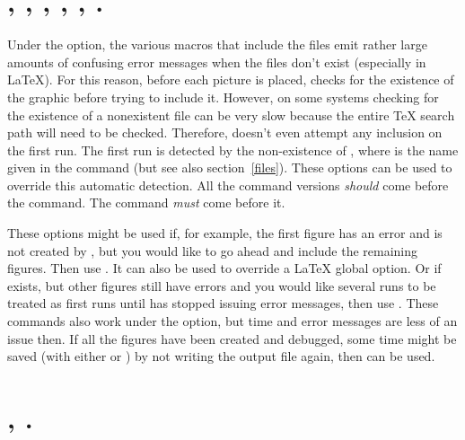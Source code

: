 \documentclass[letterpaper]{article}
\begin{document}
\section{, , , ,
    , .}\label{draft}
%
%
%
%
%

Under the  option, the various macros that include the
\EPS{} files emit rather large amounts of confusing error messages when
the files don't exist (especially in \LaTeX{}). For this reason, before
each picture is placed, \mfp{} checks for the existence of the graphic
before trying to include it. However, on some systems checking for the
existence of a nonexistent file can be very slow because the entire
\TeX{} search path will need to be checked. Therefore, \mfp{} doesn't
even attempt any inclusion on the first run. The first run is detected
by the non-existence of , where  is the
name given in the  command (but see also
section~\ref{files}). These options can be used to override this
automatic detection. All the command versions \emph{should} come before
the  command. The  command
\emph{must} come before it.

These options might be used if, for example, the first figure has an
error and is not created by \MP{}, but you would like \mfp{} to go
ahead and include the remaining figures. Then use . It can
also be used to override a \LaTeX{} global  option. Or if
 exists, but other figures still have errors and you
would like several runs to be treated as first runs until \MP{} has
stopped issuing error messages, then use .  These commands
also work under the  option, but time and error messages
are less of an issue then. If all the figures have been created and
debugged, some time might be saved (with either  or
) by not writing the output file again, then 
can be used.


\section{, .}\label{readlog}
%
\end{document}
